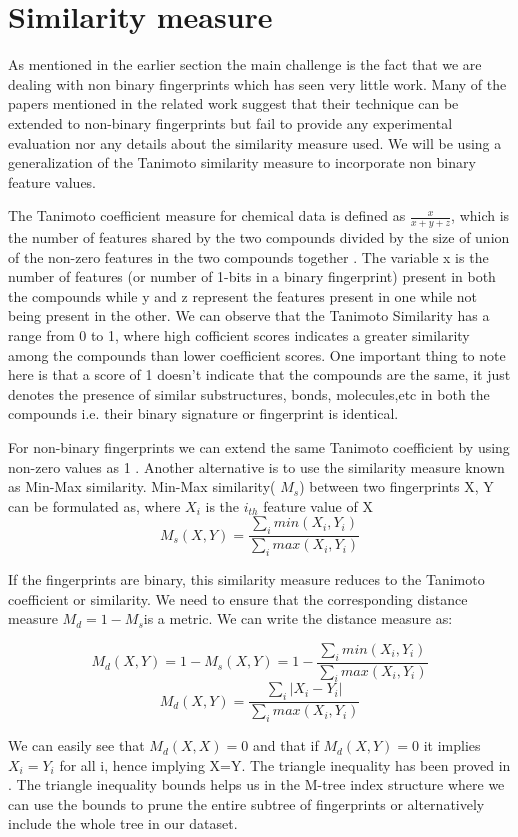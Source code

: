 \section{Similarity measure}

As mentioned in the earlier section the main challenge is the fact that we are dealing with non binary fingerprints which has seen very little work. Many of the papers mentioned in the related work suggest that their technique can be extended to non-binary fingerprints but fail to provide any experimental evaluation nor any details about the similarity measure used. We will be using a generalization of the Tanimoto similarity measure to incorporate non binary feature values. 

The Tanimoto coefficient measure for chemical data is defined as $\frac{x}{x+y+z}$, which is the number of features shared by the two compounds divided by the size of union of the non-zero features in the two compounds together . The variable x is the number of features (or number of 1-bits in a binary fingerprint) present in both the compounds while y and z represent the features present in one while not being present in the other. We can observe that the Tanimoto Similarity has a range from 0 to 1, where high cofficient scores indicates a greater similarity among the compounds than lower coefficient scores. One important thing to note here is that a score of 1 doesn't indicate that the compounds are the same, it just denotes the presence of similar substructures, bonds, molecules,etc in both the compounds i.e. their binary signature or fingerprint is identical. 

For non-binary fingerprints we can extend the same Tanimoto coefficient by using non-zero values as 1 . Another alternative is to use the similarity measure known as Min-Max similarity. Min-Max similarity( $M_s$) between two fingerprints X, Y can be formulated as, where $X_i$ is the $i_{th}$ feature value of X \[ M_s(X,Y) = \frac{\sum \limits_{i} min(X_i, Y_i)}{\sum \limits_{i} max(X_i, Y_i)}\]

If the fingerprints are binary, this similarity measure reduces to the Tanimoto coefficient or similarity. We need to ensure that the corresponding distance measure $M_d=1- M_s$is a metric. We can write the distance measure as: 

\[ M_d(X,Y) = 1- M_s(X,Y) = 1- \frac{\sum \limits_{i} min(X_i, Y_i)}{\sum \limits_{i} max(X_i, Y_i)}\]
\[ M_d(X,Y)= \frac{\sum \limits_{i} |X_i - Y_i|}{\sum \limits_{i} max(X_i, Y_i)}\]

We can easily see that $M_d(X,X)=0$ and that if $M_d(X,Y)=0 $ it implies $X_i = Y_i$ for all i, hence implying X=Y. The triangle inequality has been proved in \citet*{lipkus1999proof}. The triangle inequality bounds helps us in the M-tree index structure where we can use the bounds to prune the entire subtree of fingerprints or alternatively include the whole tree in our dataset.




